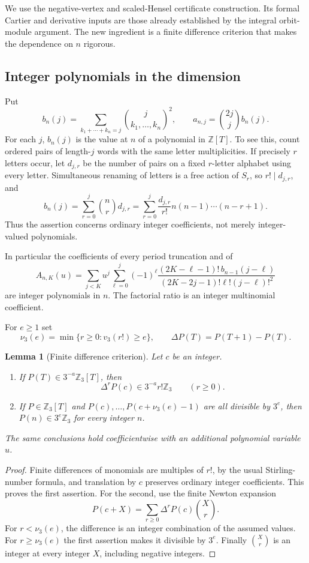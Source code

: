 \documentclass[11pt,a4paper]{article}
\newtheorem{lemma}[theorem]{Lemma}
\theoremstyle{definition}\newtheorem{definition}[theorem]{Definition}
\theoremstyle{remark}\newtheorem{remark}[theorem]{Remark}
\numberwithin{equation}{section}
\begin{document}
We use the negative-vertex and scaled-Hensel certificate construction.
Its formal Cartier and derivative inputs are those already established
by the integral orbit-module argument.  The new ingredient is a finite
difference criterion that makes the dependence on $n$ rigorous.

\subsection{Integer polynomials in the dimension}
Put
\[
 b_n(j)=\sum_{k_1+\cdots+k_n=j}
       \binom{j}{k_1,\ldots,k_n}^{\!2},\qquad
 a_{n,j}=\binom{2j}{j}b_n(j).
\]
For each $j$, $b_n(j)$ is the value at $n$ of a polynomial in
$\mathbb Z[T]$.  To see this, count ordered pairs of length-$j$ words
with the same letter multiplicities.  If precisely $r$ letters occur,
let $d_{j,r}$ be the number of pairs on a fixed $r$-letter alphabet
using every letter.  Simultaneous renaming of letters is a free action
of $S_r$, so $r!\mid d_{j,r}$, and
\[
 b_n(j)=\sum_{r=0}^j\binom nr d_{j,r}
       =\sum_{r=0}^j\frac{d_{j,r}}{r!}
             n(n-1)\cdots(n-r+1).
\]
Thus the assertion concerns ordinary integer coefficients, not merely
integer-valued polynomials.

In particular the coefficients of every period truncation and of
\[
 A_{n,K}(u)=\sum_{j<K}u^j\sum_{\ell=0}^j(-1)^\ell
 \frac{(2K-\ell-1)!\,b_{n-1}(j-\ell)}
 {(2K-2j-1)!\ell!(j-\ell)!^2}
\]
are integer polynomials in $n$.  The factorial ratio is an integer
multinomial coefficient.

For $e\geq1$ set
\[
 \nu_3(e)=\min\{r\geq0:v_3(r!)\geq e\},\qquad
 \Delta P(T)=P(T+1)-P(T).
\]

\begin{lemma}[Finite difference criterion]\label{OP:lem:newton-test}
Let $c$ be an integer.
\begin{enumerate}
\item If $P(T)\in3^{-a}\mathbb Z_3[T]$, then
\[
 \Delta^rP(c)\in3^{-a}r!\mathbb Z_3
 \qquad(r\geq0).
\]
\item If $P\in\mathbb Z_3[T]$ and
$P(c),\ldots,P(c+\nu_3(e)-1)$ are all divisible by $3^e$, then
$P(n)\in3^e\mathbb Z_3$ for every integer $n$.
\end{enumerate}
The same conclusions hold coefficientwise with an additional
polynomial variable $u$.
\end{lemma}
\begin{proof}
Finite differences of monomials are multiples of $r!$, by the usual
Stirling-number formula, and translation by $c$ preserves ordinary
integer coefficients.  This proves the first assertion.  For the
second, use the finite Newton expansion
\[
 P(c+X)=\sum_{r\geq0}\Delta^rP(c)\binom Xr.
\]
For $r<\nu_3(e)$, the difference is an integer combination of the
assumed values.  For $r\geq\nu_3(e)$ the first assertion makes it
divisible by $3^e$.  Finally $\binom Xr$ is an integer at every integer
$X$, including negative integers.
\end{proof}
\end{document}
